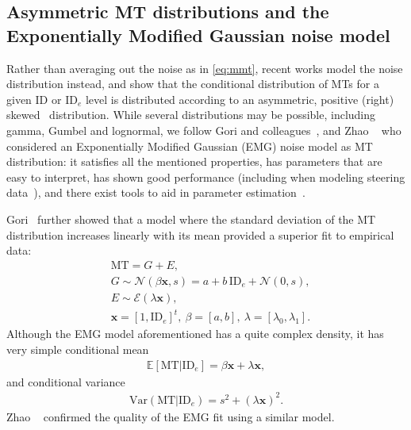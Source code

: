 \documentclass[manuscript,review,anonymous]{acmart}
\newcommand{\ide}{\ensuremath{{\text{ID}_e}}\xspace}
\begin{document}
\subsection{Asymmetric MT distributions and the Exponentially Modified Gaussian noise model \label{subs:rw::emg}}
Rather than averaging out the noise as in \autoref{eq:mmt}, recent works model the noise distribution instead, and show that the conditional distribution of MTs for a given ID or \ide level is distributed according to an asymmetric, positive (right) skewed~\cite{gori2018these,gori2019,zhao2022, jude2016,nieuwenhuizen2016, li2024,chapuis2007} distribution.
While several distributions may be possible, including gamma, Gumbel and lognormal, we follow Gori and colleagues~\cite{gori2018these,gori2019, li2024}, and Zhao \etal~\cite{zhao2022} who considered an Exponentially Modified Gaussian (EMG) noise model as MT distribution: it satisfies all the mentioned properties, has parameters that are easy to interpret, has shown good performance (including when modeling steering data~\cite{wang2021}), and there exist tools to aid in parameter estimation~\cite{li2024,emgregs}.


Gori~\cite{gori2018these} further showed that a model where the standard deviation of the MT distribution increases linearly with its mean provided a superior fit to empirical data:
\begin{align}
	 & \text{MT}   = G + E, \label{eq:emg}                                                                 \\
	 & G           \sim \mathcal{N}(\beta \mathbf{x}, s) = a + b\,\ide + \mathcal{N}(0,s), \label{eq:emg1} \\
	 & E           \sim \mathcal{E}(\lambda \mathbf{x}), \label{eq:emg2}                                   \\
	 & \mathbf{x}  = [1, \ide]^t,~\beta = [a,b],~\lambda = [\lambda_0, \lambda_1].
\end{align}
Although the EMG model aforementioned has a quite complex density, it has very simple conditional mean
\begin{align}
	\mathbb{E}[\text{MT}|\ide] = \beta \mathbf{x} + \lambda \mathbf{x}, \label{eq:emg_mean}
\end{align}
and conditional variance
\begin{align}
	\text{Var}(\text{MT}|\ide) = s^2 + (\lambda \mathbf{x})^2.
\end{align}
Zhao \etal~\cite{zhao2022} confirmed the quality of the EMG fit using a similar model.
\end{document}
